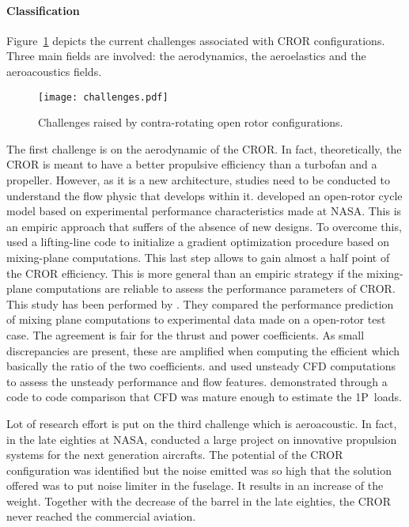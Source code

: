 
\paragraph{Classification}
Figure~\ref{fig:cror_challenges} depicts the current challenges associated
with CROR configurations. Three main fields are involved: the aerodynamics, the
aeroelastics and the aeroacoustics fields.
\begin{figure}[htbp]
  \centering
  \texttt{[image: challenges.pdf]}
  \caption{Challenges raised by contra-rotating open rotor configurations.}
  \label{fig:cror_challenges}
\end{figure}
The first challenge is on the aerodynamic of the CROR. In fact, theoretically, 
the CROR is meant to have a better propulsive efficiency than a turbofan and a
propeller. However, as it is a new architecture, studies need to be conducted
to understand the flow physic that develops within it.
\citet{Hendricks2011} developed an open-rotor cycle model based
on experimental performance characteristics made at NASA. This is 
an empiric approach that suffers of the absence of new designs. To
overcome this, \citet{Bechet2011} used a lifting-line code to
initialize a gradient optimization procedure based on mixing-plane
computations. This last step allows to gain almost a half point of
the CROR efficiency. This is more general than an empiric strategy
if the mixing-plane computations are reliable to assess the performance
parameters of CROR. This study has been performed by \citet{Zachariadis2011}.
They compared the performance prediction of mixing plane computations
to experimental data made on a open-rotor test case.
The agreement is fair for the thrust and power coefficients.
As small discrepancies are present, these are amplified when computing
the efficient which basically the ratio of the two coefficients.
\citet{Vion2011} and \citet{Stuermer2008} used unsteady
CFD computations to assess the unsteady performance and flow features.
\citet{Stuermer2008} \citet{Francois2013} demonstrated through a code to code comparison
that CFD was mature enough to estimate the 1P~loads.

Lot of research effort is put on the third challenge which
is aeroacoustic. In fact, in the late eighties at NASA, \citet{Hager1988}
conducted a large project on innovative propulsion systems for the
next generation aircrafts. The potential of the CROR configuration
was identified but the noise emitted was so high that the solution
offered was to put noise limiter in the fuselage. It results in 
an increase of the weight. Together with the decrease of the
barrel in the late eighties, the CROR never reached the commercial
aviation.
